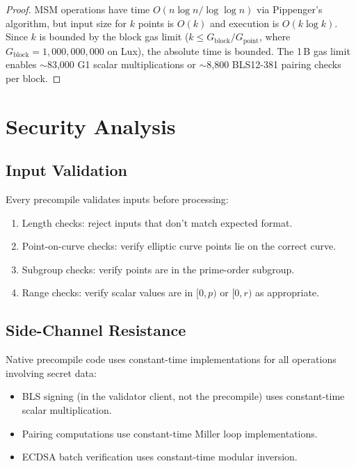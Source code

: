 \documentclass[11pt,a4paper]{article}
\begin{document}
\begin{proof}
MSM operations have time $O(n \log n / \log \log n)$ via Pippenger's algorithm, but input size for $k$ points is $O(k)$ and execution is $O(k \log k)$. Since $k$ is bounded by the block gas limit ($k \leq G_{\text{block}} / G_{\text{point}}$, where $G_{\text{block}} = 1{,}000{,}000{,}000$ on Lux), the absolute time is bounded. The 1\,B gas limit enables $\sim$83{,}000 G1 scalar multiplications or $\sim$8{,}800 BLS12-381 pairing checks per block.
\end{proof}

\section{Security Analysis}\label{sec:security}

\subsection{Input Validation}

Every precompile validates inputs before processing:
\begin{enumerate}
    \item Length checks: reject inputs that don't match expected format.
    \item Point-on-curve checks: verify elliptic curve points lie on the correct curve.
    \item Subgroup checks: verify points are in the prime-order subgroup.
    \item Range checks: verify scalar values are in $[0, p)$ or $[0, r)$ as appropriate.
\end{enumerate}

\subsection{Side-Channel Resistance}

Native precompile code uses constant-time implementations for all operations involving secret data:
\begin{itemize}
    \item BLS signing (in the validator client, not the precompile) uses constant-time scalar multiplication.
    \item Pairing computations use constant-time Miller loop implementations.
    \item ECDSA batch verification uses constant-time modular inversion.
\end{itemize}
\end{document}
